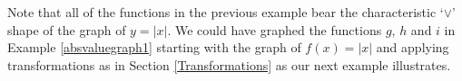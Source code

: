 Note that all of the functions in the previous example bear the characteristic `$\vee$' shape of the graph of $y=|x|$.  We could have graphed the functions $g$, $h$ and $i$ in Example \ref{absvaluegraph1} starting with the graph of $f(x)=|x|$ and applying transformations as in Section \ref{Transformations} as our next example illustrates.

\pagebreak

